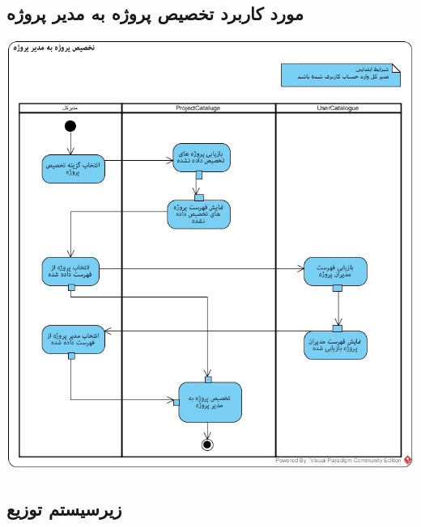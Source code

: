 \subsection*{مورد کاربرد تخصیص پروژه به مدیر پروژه}
\vspace{1cm}
\begin{center}
\includegraphics[width=\textwidth]{ActivityDiagramsWithSwimlanes/34.jpg}
\end{center}


\subsection{زیرسیستم توزیع}
\vspace{1cm}

